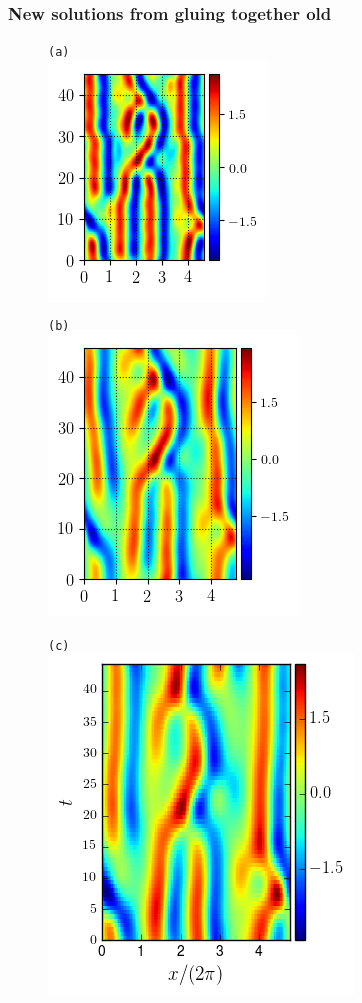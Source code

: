 \documentclass[mathserif, handout]{beamer}
\begin{document}
\begin{frame}
\frametitle{New solutions from gluing together old}
\begin{figure}
\begin{minipage}[height=.2\textheight]{.5\textwidth}
\centering \small{\texttt{(a)}}\\
\includegraphics[width=.5\textwidth,height=.2\textheight]{MNG_ppo_tiling_init_0}
\end{minipage}
\begin{minipage}[height=.2\textheight]{.5\textwidth}
\centering \small{\texttt{(b)}}\\
\includegraphics[width=.5\textwidth,height=.2\textheight]{MNG_ppo_tiling_final_0}
\end{minipage}
\begin{minipage}[height=.2\textheight]{.5\textwidth}
\centering \small{\texttt{(c)}}\\
\includegraphics[width=.5\textwidth,height=.2\textheight]{MNG_ppo_L30_T44}
\end{minipage}
\end{figure}
\end{frame}
\end{document}
